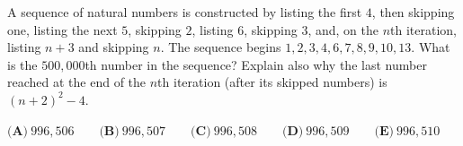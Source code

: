 A sequence of natural numbers is constructed by listing the first $4$, then skipping one, listing the next $5$, skipping $2$, listing $6$, skipping $3$, and, on the $n$th iteration, listing $n+3$ and skipping $n$. The sequence begins $1,2,3,4,6,7,8,9,10,13$. What is the $500{,}000$th number in the sequence? Explain also why the last number reached at the end of the $n$th iteration (after its skipped numbers) is $(n+2)^2-4$.

$\textbf{(A)}\ 996{,}506\qquad\textbf{(B)}\ 996{,}507\qquad\textbf{(C)}\ 996{,}508\qquad\textbf{(D)}\ 996{,}509\qquad\textbf{(E)}\ 996{,}510$
